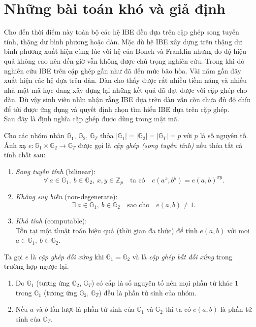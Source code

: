 \documentclass[class=report, crop=false]{standalone}
\begin{document}
	\section{Những bài toán khó và giả định}
		Cho đến thời điểm này toàn bộ các hệ IBE đều dựa trên cặp ghép song tuyến tính, thặng dư bình phương hoặc dàn. Mặc dù hệ IBE xây dựng trên thặng dư bình phương \cite{DBLP:conf/ima/Cocks01} xuất hiện cùng lúc với hệ của Boneh và Franklin \cite{DBLP:conf/crypto/BonehF01} nhưng do độ hiệu quả không cao nên đến giờ vẫn không được chú trọng nghiên cứu. Trong khi đó nghiên cứu IBE trên cặp ghép gần như đã đến mức bão hòa. Vài năm gần đây xuất hiện các hệ dựa trên dàn. Dàn cho thấy được rất nhiều tiềm năng và nhiều nhà mật mã học đang xây dựng lại những kết quả đã đạt được với cặp ghép cho dàn. Dù vậy sinh viên nhìn nhận rằng IBE dựa trên dàn vẫn còn chưa đủ độ chín để tới được ứng dụng và quyết định chọn tìm hiểu IBE dựa trên cặp ghép. \\ \indent
		Sau đây là định nghĩa cặp ghép được dùng trong mật mã.
		\begin{definition}
			Cho các nhóm nhân $\mathbb{G}_1$, $\mathbb{G}_2$, $\mathbb{G}_T$ thỏa $|\mathbb{G}_1| = |\mathbb{G}_2| = |\mathbb{G}_T| = p$ với $p$ là số nguyên tố. Ánh xạ $e: \mathbb{G}_1 \times \mathbb{G}_2 \rightarrow \mathbb{G}_T$ được gọi là \textit{cặp ghép (song tuyến tính)} nếu thỏa tất cả tính chất sau:
			\vspace{-0.5cm}
			\begin{enumerate}[leftmargin=1.5cm, itemindent=-0.5cm]
				\item \textit{Song tuyến tính} (bilinear):
				\[
					\forall\ a \in \mathbb{G}_1,\ b \in \mathbb{G}_2,\ x, y \in \mathbb{Z}_p \quad \text{ta có} \quad e(a^x, b^y) = e(a, b)^{xy}.
				\]
				\item \textit{Không suy biến} (non-degenerate):
				\[
					\exists\ a \in \mathbb{G}_1,\ b \in \mathbb{G}_2 \quad \text{sao cho} \quad e(a, b) \neq 1.
				\]
				\item \textit{Khả tính} (computable): \\
				Tồn tại một thuật toán hiệu quả (thời gian đa thức) để tính $e(a, b)$ với mọi $a \in \mathbb{G}_1,\ b \in \mathbb{G}_2$.
			\end{enumerate} \par
			Ta gọi $e$ là \textit{cặp ghép đối xứng} khi $\mathbb{G}_1 = \mathbb{G}_2$ và là \textit{cặp ghép bất đối xứng} trong trường hợp ngược lại.
		\end{definition}
		\begin{remark}
			\leavevmode \vspace{-\baselineskip}
			\begin{enumerate}[label=(\roman*), leftmargin=1cm]
				\item Do $\mathbb{G}_1$ (tương ứng $\mathbb{G}_2$, $\mathbb{G}_T$) có cấp là số nguyên tố nên mọi phần tử khác $1$ trong $\mathbb{G}_1$ (tương ứng $\mathbb{G}_2$, $\mathbb{G}_T$) đều là phần tử sinh của nhóm.
				\item Nếu $a$ và $b$ lần lượt là phần tử sinh của $\mathbb{G}_1$ và $\mathbb{G}_2$ thì ta có $e(a, b)$ là phần tử sinh của $\mathbb{G}_T$. \label{remark:pairing.2}
			\end{enumerate}
		\end{remark}
\end{document}
